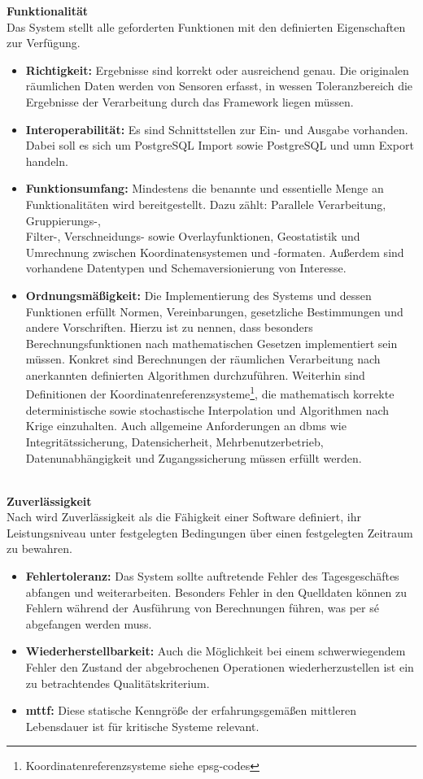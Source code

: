 \textbf{Funktionalität}\\
Das System stellt alle geforderten Funktionen mit den definierten Eigenschaften zur Verfügung.
\begin{itemize}
\item \textbf{Richtigkeit:} Ergebnisse sind korrekt oder ausreichend genau.
Die originalen räumlichen Daten werden von Sensoren erfasst, in wessen Toleranzbereich die Ergebnisse der Verarbeitung durch das Framework liegen müssen.
\item \textbf{Interoperabilität:} Es sind Schnittstellen zur Ein- und Ausgabe vorhanden. Dabei soll es sich um PostgreSQL Import sowie PostgreSQL und \Gls{umn} Export handeln.
\item \textbf{Funktionsumfang:} Mindestens die benannte und essentielle Menge an Funktionalitäten wird bereitgestellt. Dazu zählt:
Parallele Verarbeitung, Gruppierungs-,\\Filter-, Verschneidungs- sowie Overlayfunktionen, Geostatistik und Umrechnung zwischen Koordinatensystemen und -formaten.
Außerdem sind vorhandene Datentypen und Schemaversionierung von Interesse.
\item \textbf{Ordnungsmäßigkeit:} Die Implementierung des Systems und dessen Funktionen erfüllt Normen, Vereinbarungen, gesetzliche Bestimmungen und andere Vorschriften. Hierzu ist zu nennen, dass besonders Berechnungsfunktionen nach mathematischen Gesetzen implementiert sein müssen. Konkret sind Berechnungen der räumlichen Verarbeitung nach anerkannten definierten Algorithmen durchzuführen. Weiterhin sind Definitionen der Koordinatenreferenzsysteme\footnote{Koordinatenreferenzsysteme siehe \Glspl{epsg-code}}, die mathematisch korrekte deterministische sowie stochastische Interpolation und Algorithmen nach Krige einzuhalten. Auch allgemeine Anforderungen an \Gls{dbms} wie Integritätssicherung, Datensicherheit, Mehrbenutzerbetrieb, Datenunabhängigkeit und Zugangssicherung müssen erfüllt werden.
\end{itemize}
\ \\
%
\textbf{Zuverlässigkeit}\\
Nach \cite[S.259]{book:lehrbuchsoftware} wird Zuverlässigkeit als die Fähigkeit einer Software definiert,  ihr Leistungsniveau unter festgelegten Bedingungen über einen festgelegten Zeitraum zu bewahren.
\begin{itemize}
\item \textbf{Fehlertoleranz:} Das System sollte auftretende Fehler des Tagesgeschäftes abfangen und weiterarbeiten. Besonders Fehler in den Quelldaten können zu Fehlern während der Ausführung von Berechnungen führen, was per s\'{e} abgefangen werden muss.
\item \textbf{Wiederherstellbarkeit:} Auch die Möglichkeit bei einem schwerwiegendem Fehler den Zustand der abgebrochenen Operationen wiederherzustellen ist ein zu betrachtendes Qualitätskriterium.
\item \textbf{\Gls{mttf}:} Diese statische Kenngröße der erfahrungsgemäßen mittleren Lebensdauer ist für kritische Systeme relevant.
\end{itemize}
